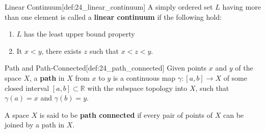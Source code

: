 \begin{defBox}{Linear Continuum}[def:24_linear_continuum]
    A simply ordered set \( L \) having more than one element is called a 
    \textbf{linear continuum} if the following hold:
    \begin{enumerate}
        \item \( L \) has the least upper bound property
        \item It \( x < y \), there exists \( z \) such that \( x < z < y \).
    \end{enumerate}
\end{defBox}

\begin{defBox}{Path and Path-Connected}[def:24_path_connected]
    Given points \( x \) and \( y \) of the space \( X \), a \textbf{path} in 
    \( X \) from \( x \) to \( y \) is a continuous map 
    \( \gamma: [ a, b ] \rightarrow X \) of some closed interval \( [ a, b ]
    \subset \mathbb{R} \) with the subspace topology into \( X \),
    such that \( \gamma ( a ) = x \) and \( \gamma ( b ) = y \).

    \baseSkip

    A space \( X \) is said to be \textbf{path connected} if every pair of 
    points of \( X \) can be joined by a path in \( X \).
\end{defBox}

